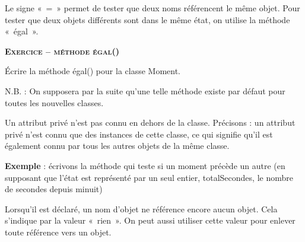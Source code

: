 \begin{liste}
	\item 
		Le signe «~=~» permet de tester que deux noms référencent le même objet.
		Pour tester que deux objets différents sont dans le même état, on
		utilise la méthode «~égal~».
		\\
		\bigskip
\end{liste}

\bigskip

{\sffamily\bfseries\scshape
Exercice – méthode égal()}

Écrire la méthode égal() pour la classe Moment.

\bigskip

N.B. : On supposera par la suite qu'une telle méthode
existe par défaut pour toutes les nouvelles classes.

\begin{liste}
	\item {
		Un attribut privé n'est pas connu en dehors de la
		classe. Précisons : un attribut privé n'est connu que
		des instances de cette classe, ce qui signifie qu'il
		est également connu par tous les autres objets de la même
		classe.

		\textbf{Exemple} : écrivons la méthode qui teste si un moment précède un
		autre (en supposant que l'état est représenté par un
		seul entier, totalSecondes, le nombre de secondes depuis minuit)
		\\
		\bigskip
		\bigskip
		}
	\item {
		Lorsqu'il est déclaré, un nom d'objet
		ne référence encore aucun objet. Cela s'indique par la
		valeur «~rien~». On peut aussi utiliser cette valeur pour enlever toute
		référence vers un objet.
		\\
		\bigskip
		}
\end{liste}
	

